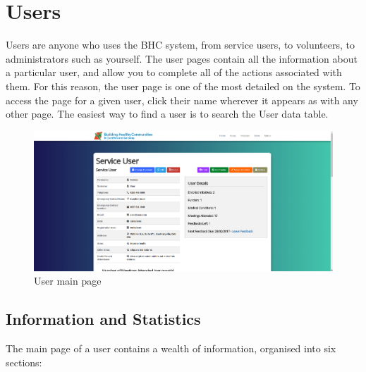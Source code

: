 \documentclass{bhcguides}
\begin{document}
\pagebreak

\section{Users}
\label{sec:users}

Users are anyone who uses the BHC system, from service users, to volunteers, to administrators such as yourself. The user pages contain all the information about a particular user, and allow you to complete all of the actions associated with them. For this reason, the user page is one of the most detailed on the system. To access the page for a given user, click their name wherever it appears as with any other page. The easiest way to find a user is to search the User data table.

\begin{figure}[h]
 \centerline{\includegraphics[width=\textwidth, height=\textheight, keepaspectratio]{userpage.png}}
 \caption{User main page}
 \label{fig:userMainPage}
\end{figure}

\subsection{Information and Statistics}
\label{ssec:userinfoandstats}

The main page of a user contains a wealth of information, organised into six sections:
\end{document}
